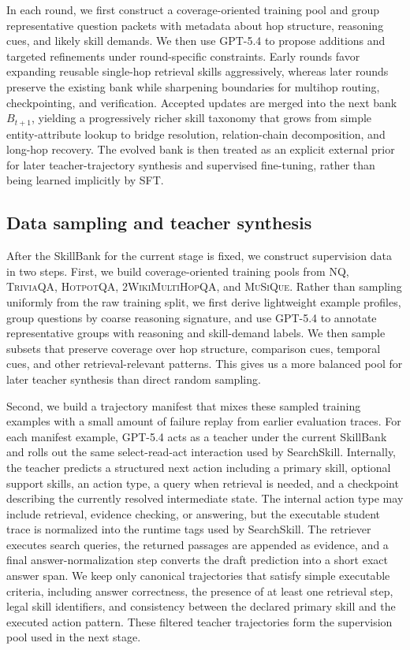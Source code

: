 \documentclass{article}
\begin{document}
In each round, we first construct a coverage-oriented training pool and group representative question packets with metadata about hop structure, reasoning cues, and likely skill demands. We then use \textsc{GPT-5.4} to propose additions and targeted refinements under round-specific constraints. Early rounds favor expanding reusable single-hop retrieval skills aggressively, whereas later rounds preserve the existing bank while sharpening boundaries for multihop routing, checkpointing, and verification. Accepted updates are merged into the next bank \(B_{t+1}\), yielding a progressively richer skill taxonomy that grows from simple entity-attribute lookup to bridge resolution, relation-chain decomposition, and long-hop recovery. The evolved bank is then treated as an explicit external prior for later teacher-trajectory synthesis and supervised fine-tuning, rather than being learned implicitly by SFT.

\subsection{Data sampling and teacher synthesis}
After the SkillBank for the current stage is fixed, we construct supervision data in two steps. First, we build coverage-oriented training pools from \textsc{NQ}, \textsc{TriviaQA}, \textsc{HotpotQA}, \textsc{2WikiMultiHopQA}, and \textsc{MuSiQue}. Rather than sampling uniformly from the raw training split, we first derive lightweight example profiles, group questions by coarse reasoning signature, and use \textsc{GPT-5.4} to annotate representative groups with reasoning and skill-demand labels. We then sample subsets that preserve coverage over hop structure, comparison cues, temporal cues, and other retrieval-relevant patterns. This gives us a more balanced pool for later teacher synthesis than direct random sampling.

Second, we build a trajectory manifest that mixes these sampled training examples with a small amount of failure replay from earlier evaluation traces. For each manifest example, \textsc{GPT-5.4} acts as a teacher under the current SkillBank and rolls out the same select-read-act interaction used by SearchSkill. Internally, the teacher predicts a structured next action including a primary skill, optional support skills, an action type, a query when retrieval is needed, and a checkpoint describing the currently resolved intermediate state. The internal action type may include retrieval, evidence checking, or answering, but the executable student trace is normalized into the runtime tags used by SearchSkill. The retriever executes search queries, the returned passages are appended as evidence, and a final answer-normalization step converts the draft prediction into a short exact answer span. We keep only canonical trajectories that satisfy simple executable criteria, including answer correctness, the presence of at least one retrieval step, legal skill identifiers, and consistency between the declared primary skill and the executed action pattern. These filtered teacher trajectories form the supervision pool used in the next stage.
\end{document}
